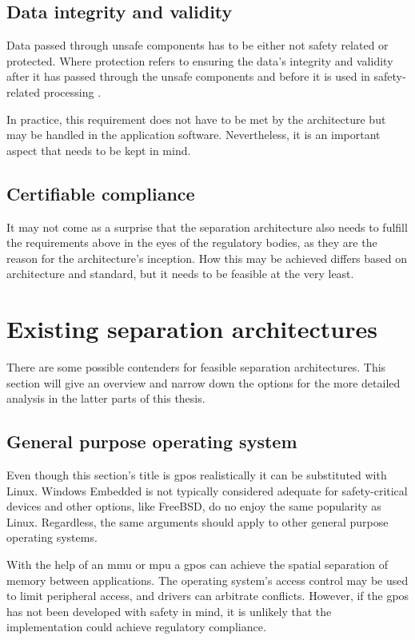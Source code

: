 \subsection{Data integrity and validity}
Data passed through unsafe components has to be either not safety related or protected. Where protection refers to ensuring the data's integrity and validity after it has passed through the unsafe components and before it is used in safety-related processing \cite{wittenstein2017spatial}.

In practice, this requirement does not have to be met by the architecture but may be handled in the application software. Nevertheless, it is an important aspect that needs to be kept in mind.
\subsection{Certifiable compliance}
It may not come as a surprise that the separation architecture also needs to fulfill the requirements above in the eyes of the regulatory bodies, as they are the reason for the architecture's inception.
How this may be achieved differs based on architecture and standard, but it needs to be feasible at the very least. 


\section{Existing separation architectures}
There are some possible contenders for feasible separation architectures. This section will give an overview and narrow down the options for the more detailed analysis in the latter parts of this thesis.
\subsection{General purpose operating system}
Even though this section's title is \acrfull{gpos} realistically it can be substituted with Linux. Windows Embedded is not typically considered adequate for safety-critical devices and other options, like FreeBSD, do no enjoy the same popularity as Linux. Regardless, the same arguments should apply to other general purpose operating systems.

With the help of an \acrfull{mmu} or \acrfull{mpu}  a \acrshort{gpos} can achieve the spatial separation of memory between applications. The operating system's access control may be used to limit peripheral access, and drivers can arbitrate conflicts. However, if the \acrshort{gpos} has not been developed with safety in mind, it is unlikely that the implementation could achieve regulatory compliance.

